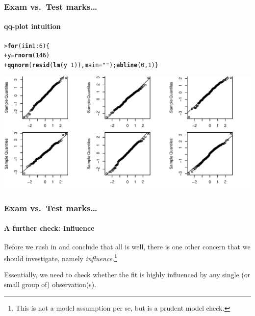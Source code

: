 \documentclass{beamer}\usepackage[]{graphicx}\usepackage[]{xcolor}
\makeatletter
\def\maxwidth{ %
  \ifdim\Gin@nat@width>\linewidth
    \linewidth
  \else
    \Gin@nat@width
  \fi
}
\newcommand{\hlnum}[1]{\textcolor[rgb]{0.686,0.059,0.569}{#1}}%
\newcommand{\hlstr}[1]{\textcolor[rgb]{0.192,0.494,0.8}{#1}}%
\newcommand{\hlopt}[1]{\textcolor[rgb]{0,0,0}{#1}}%
\newcommand{\hlstd}[1]{\textcolor[rgb]{0.345,0.345,0.345}{#1}}%
\newcommand{\hlkwa}[1]{\textcolor[rgb]{0.161,0.373,0.58}{\textbf{#1}}}%
\newcommand{\hlkwb}[1]{\textcolor[rgb]{0.69,0.353,0.396}{#1}}%
\newcommand{\hlkwc}[1]{\textcolor[rgb]{0.333,0.667,0.333}{#1}}%
\newcommand{\hlkwd}[1]{\textcolor[rgb]{0.737,0.353,0.396}{\textbf{#1}}}%
\newenvironment{kframe}{%
 \def\at@end@of@kframe{}%
 \ifinner\ifhmode%
  \def\at@end@of@kframe{\end{minipage}}%
  \begin{minipage}{\columnwidth}%
 \fi\fi%
 \def\FrameCommand##1{\hskip\@totalleftmargin \hskip-\fboxsep
 \colorbox{shadecolor}{##1}\hskip-\fboxsep
     \hskip-\linewidth \hskip-\@totalleftmargin \hskip\columnwidth}%
 \MakeFramed {\advance\hsize-\width
   \@totalleftmargin\z@ \linewidth\hsize
   \@setminipage}}%
 {\par\unskip\endMakeFramed%
 \at@end@of@kframe}
\newenvironment{knitrout}{}{} %
\makeatother
\begin{document}
\begin{frame}[fragile]
\frametitle{Exam vs.\ Test marks\ldots}
\framesubtitle{qq-plot intuition}

\begin{knitrout}\scriptsize
{}\color{fgcolor}\begin{kframe}
\begin{alltt}
\hlstd{> }\hlkwa{for}\hlstd{(i} \hlkwa{in} \hlnum{1}\hlopt{:}\hlnum{6}\hlstd{) \{}
\hlstd{+ }  \hlstd{y}\hlkwb{=}\hlkwd{rnorm}\hlstd{(}\hlnum{146}\hlstd{)}
\hlstd{+ }  \hlkwd{qqnorm}\hlstd{(}\hlkwd{resid}\hlstd{(}\hlkwd{lm}\hlstd{(y}\hlopt{~}\hlnum{1}\hlstd{)),}\hlkwc{main}\hlstd{=}\hlstr{""}\hlstd{);} \hlkwd{abline}\hlstd{(}\hlnum{0}\hlstd{,}\hlnum{1}\hlstd{) \}}
\end{alltt}
\end{kframe}
\includegraphics[width=\maxwidth]{figure/RC-H02-015b-1} 
\end{knitrout}

\end{frame}



\begin{frame}[fragile]
\frametitle{Exam vs.\ Test marks\ldots}
\framesubtitle{A further check: Influence}

Before we rush in and conclude that all is well, 
there is one other concern that we should investigate, namely \emph{influence}.\footnote{This is not a model assumption per se, but is a prudent model check.}

\bigskip

Essentially, we need to check whether the fit is highly influenced by any single
(or small group of) observation(s).

\end{frame}




\end{document}
